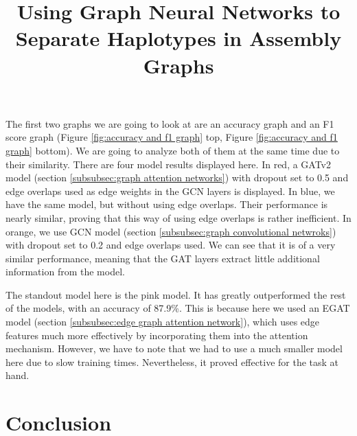 \documentclass[times, utf8, diplomski, english]{fer_eng}
\begin{document}
The first two graphs we are going to look at are an accuracy graph and an F1 score graph (Figure \ref{fig:accuracy and f1 graph} top, Figure \ref{fig:accuracy and f1 graph} bottom). We are going to analyze both of them at the same time due to their similarity. There are four model results displayed here. In red, a GATv2 model (section \ref{subsubsec:graph attention networks}) with dropout set to 0.5 and edge overlaps used as edge weights in the GCN layers is displayed. In blue, we have the same model, but without using edge overlaps. Their performance is nearly similar, proving that this way of using edge overlaps is rather inefficient. In orange, we use GCN model (section \ref{subsubsec:graph convolutional netwroks}) with dropout set to 0.2 and edge overlaps used. We can see that it is of a very similar performance, meaning that the GAT layers extract little additional information from the model.

The standout model here is the pink model. It has greatly outperformed the rest of the models, with an accuracy of 87.9\%. This is because here we used an EGAT model (section \ref{subsubsec:edge graph attention network}), which uses edge features much more effectively by incorporating them into the attention mechanism. However, we have to note that we had to use a much smaller model here due to slow training times. Nevertheless, it proved effective for the task at hand.

\chapter{Conclusion}





\clearpage

\title{Using Graph Neural Networks to Separate Haplotypes in Assembly Graphs}
\begin{abstract}

\keywords{}
\end{abstract}

\hrtitle{}
\begin{sazetak}

\kljucnerijeci{}
\end{sazetak}
\end{document}

